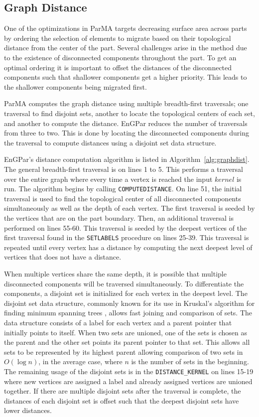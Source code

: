 \subsection{Graph Distance}
One of the optimizations in ParMA targets decreasing surface area across parts
by ordering the selection of elements to migrate based on their topological
distance from the center of the part. Several challenges arise in the method
due to the existence of disconnected components throughout the part. To get
an optimal ordering it is important to offset the distances of the disconnected
components such that shallower components get a higher priority. This leads to
the shallower components being migrated first. 

ParMA computes the graph distance using multiple breadth-first traversals; one
traversal to find disjoint sets, another to locate the topological centers of
each set, and another to compute the distance.
EnGPar reduces the number of traversals from three to two. This
is done by locating the disconnected components during the
traversal to compute distances using a disjoint set data structure.

EnGPar's distance computation algorithm is listed in
Algorithm~\ref{alg:graphdist}. The general breadth-first
traversal is on lines 1 to 5. This performs a
traversal over the entire graph where every time a vertex
is reached the input $kernel$ is run. The algorithm begins
by calling \texttt{COMPUTEDISTANCE}. On line 51, the initial
traversal is used to find the topological center of all
disconnected components simultaneously as well as
the depth of each vertex. The first traversal is seeded
by the vertices that are on the part boundary. Then, an
additional traversal is performed on lines 55-60. This traversal is seeded
by the deepest vertices of the first traversal found
in the \texttt{SETLABELS} procedure on lines 25-39. This
traversal is repeated until every vertex has a
distance by computing the next deepest level of vertices
that does not have a distance.

When multiple vertices share the same depth,
it is possible that multiple disconnected components will
be traversed simultaneously. To differentiate the
components, a disjoint set  is initialized for each
vertex in the deepest level. The disjoint set data
structure, commonly known for its use in Kruskal's
algorithm for finding minimum spanning trees \cite{disjointset}, allows fast joining
and comparison of sets. The data structure consists of a label for each vertex
and a parent pointer that initially points to itself. When two sets are unioned,
one of the sets is chosen as the parent and the other set points its parent
pointer to that set. This allows all sets to be represented by its highest
parent allowing comparison of two sets in $O(\log{n})$, in the average case,
where $n$ is the number of sets in the beginning. The
remaining usage of the disjoint sets
is in the \texttt{DISTANCE\_KERNEL} on lines 15-19 where new vertices are assigned
a label and already assigned vertices are unioned together. If there are
multiple disjoint sets after the traversal is complete,
the distances of each disjoint
set is offset such that the deepest disjoint sets have lower distances.

